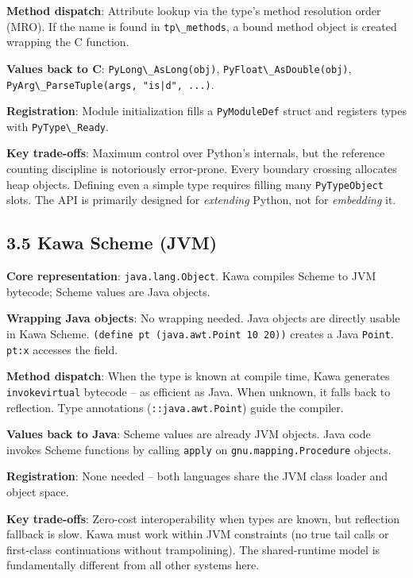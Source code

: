\documentclass[
  12pt,
]{report}
\newcommand{\passthrough}[1]{#1}
\begin{document}
\textbf{Method dispatch}: Attribute lookup via the type's method
resolution order (MRO). If the name is found in
\passthrough{\lstinline!tp\_methods!}, a bound method object is created
wrapping the C function.

\textbf{Values back to C}:
\passthrough{\lstinline!PyLong\_AsLong(obj)!},
\passthrough{\lstinline!PyFloat\_AsDouble(obj)!},
\passthrough{\lstinline!PyArg\_ParseTuple(args, "is|d", ...)!}.

\textbf{Registration}: Module initialization fills a
\passthrough{\lstinline!PyModuleDef!} struct and registers types with
\passthrough{\lstinline!PyType\_Ready!}.

\textbf{Key trade-offs}: Maximum control over Python's internals, but
the reference counting discipline is notoriously error-prone. Every
boundary crossing allocates heap objects. Defining even a simple type
requires filling many \passthrough{\lstinline!PyTypeObject!} slots. The
API is primarily designed for \emph{extending} Python, not for
\emph{embedding} it.

\subsection{3.5 Kawa Scheme (JVM)}\label{kawa-scheme-jvm}

\textbf{Core representation}:
\passthrough{\lstinline!java.lang.Object!}. Kawa compiles Scheme to JVM
bytecode; Scheme values are Java objects.

\textbf{Wrapping Java objects}: No wrapping needed. Java objects are
directly usable in Kawa Scheme.
\passthrough{\lstinline!(define pt (java.awt.Point 10 20))!} creates a
Java \passthrough{\lstinline!Point!}. \passthrough{\lstinline!pt:x!}
accesses the field.

\textbf{Method dispatch}: When the type is known at compile time, Kawa
generates \passthrough{\lstinline!invokevirtual!} bytecode -- as
efficient as Java. When unknown, it falls back to reflection. Type
annotations (\passthrough{\lstinline!::java.awt.Point!}) guide the
compiler.

\textbf{Values back to Java}: Scheme values are already JVM objects.
Java code invokes Scheme functions by calling
\passthrough{\lstinline!apply!} on
\passthrough{\lstinline!gnu.mapping.Procedure!} objects.

\textbf{Registration}: None needed -- both languages share the JVM class
loader and object space.

\textbf{Key trade-offs}: Zero-cost interoperability when types are
known, but reflection fallback is slow. Kawa must work within JVM
constraints (no true tail calls or first-class continuations without
trampolining). The shared-runtime model is fundamentally different from
all other systems here.
\end{document}
